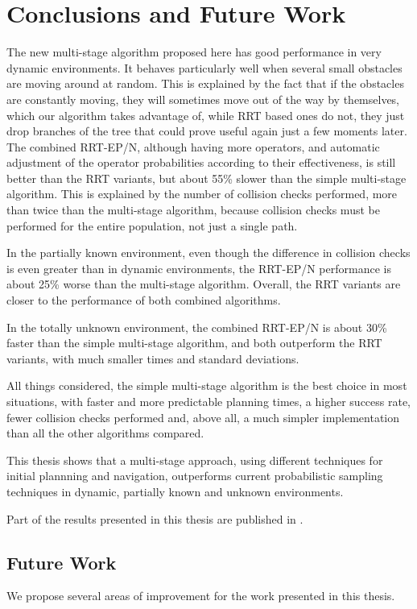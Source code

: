 \chapter{Conclusions and Future Work}
\label{sec:conclusions}

The new multi-stage algorithm proposed here has good performance in
very dynamic environments. It behaves particularly well when several small
obstacles are moving around at random. This is explained by the fact
that if the obstacles are constantly moving, they will sometimes move out of the
way by themselves, which our algorithm takes advantage of, while RRT based
ones do not, they just drop branches of the tree that could prove useful
again just a few moments later. The combined \mbox{RRT-EP/N}, although having more
operators, and automatic adjustment of the operator probabilities according to
their effectiveness, is still better than the RRT variants, but about 55\% 
slower than the
simple multi-stage algorithm. This is explained by the number of collision
checks performed, more than twice than the multi-stage algorithm, because
collision checks must be performed for the entire population, not just a single
path.

In the partially known environment, even though the difference in collision checks
is even greater than in dynamic environments, the RRT-EP/N performance is
about 25\% worse than the multi-stage algorithm. Overall, the RRT variants
are closer to the performance of both combined algorithms.

In the totally unknown environment, the combined RRT-EP/N is about 30\% faster
than the simple multi-stage algorithm, and both outperform the RRT variants,
with much smaller times and standard deviations.

All things considered, the simple multi-stage algorithm is the best choice in
most situations, with
faster and more predictable planning times, a higher success
rate, fewer collision checks performed and, above all, a much simpler
implementation than all the other algorithms compared.

This thesis shows that a multi-stage approach, using different techniques for
initial plannning and navigation, outperforms current probabilistic sampling
techniques in dynamic, partially known and unknown environments.

Part of the results presented in this thesis are published in \cite{Barriga09}.

\section{Future Work}
We propose several areas of improvement for the work presented in this thesis.
